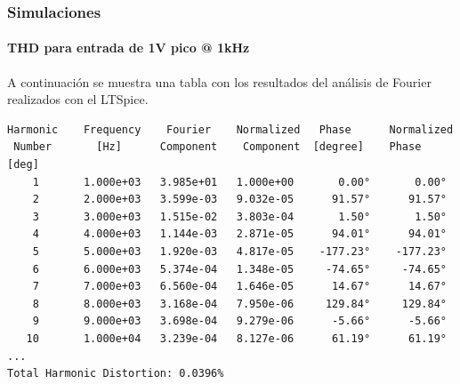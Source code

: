 \documentclass[a4paper,12pt,twoside]{article}
\begin{document}



\subsubsection{Simulaciones}


\paragraph{THD para entrada de 1V pico @ 1kHz} A continuación se muestra una tabla con los resultados del análisis de Fourier realizados con el LTSpice. 




\begin{verbatim}
Harmonic	Frequency	 Fourier 	Normalized	 Phase  	Normalized
 Number 	  [Hz]   	Component	 Component	[degree]	Phase [deg]
    1   	1.000e+03	3.985e+01	1.000e+00	    0.00°	    0.00°
    2   	2.000e+03	3.599e-03	9.032e-05	   91.57°	   91.57°
    3   	3.000e+03	1.515e-02	3.803e-04	    1.50°	    1.50°
    4   	4.000e+03	1.144e-03	2.871e-05	   94.01°	   94.01°
    5   	5.000e+03	1.920e-03	4.817e-05	 -177.23°	 -177.23°
    6   	6.000e+03	5.374e-04	1.348e-05	  -74.65°	  -74.65°
    7   	7.000e+03	6.560e-04	1.646e-05	   14.67°	   14.67°
    8   	8.000e+03	3.168e-04	7.950e-06	  129.84°	  129.84°
    9   	9.000e+03	3.698e-04	9.279e-06	   -5.66°	   -5.66°
   10   	1.000e+04	3.239e-04	8.127e-06	   61.19°	   61.19°
...
Total Harmonic Distortion: 0.0396%


\end{verbatim}
\end{document}
